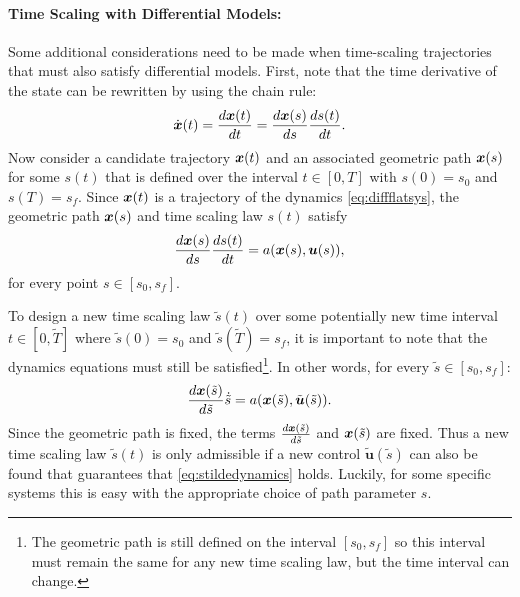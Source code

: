 \paragraph{Time Scaling with Differential Models:}
Some additional considerations need to be made when time-scaling trajectories that must also satisfy differential models.
First, note that the time derivative of the state can be rewritten by using the chain rule:
\begin{equation*}
\dot{\bm{x}}(t) = \frac{d\bm{x}(t)}{dt} = \frac{d\bm{x}(s)}{ds} \frac{ds(t)}{dt}.
\end{equation*}
Now consider a candidate trajectory $\bm{x}(t)$ and an associated geometric path $\bm{x}(s)$ for some $s(t)$ that is defined over the interval $t\in[0,T]$ with $s(0) = s_0$ and $s(T) = s_f$. Since $\bm{x}(t)$ is a trajectory of the dynamics \eqref{eq:diffflatsys}, the geometric path $\bm{x}(s)$ and time scaling law $s(t)$ satisfy
\begin{equation}
\frac{d\bm{x}(s)}{ds} \frac{ds(t)}{dt} = a(\bm{x}(s), \bm{u}(s)),
\end{equation}
for every point $s \in [s_0, s_f]$.

To design a new time scaling law $\tilde{s}(t)$ over some potentially new time interval $t \in [0,\tilde{T}]$ where $\tilde{s}(0) = s_0$ and $\tilde{s}(\tilde{T}) = s_f$, it is important to note that the dynamics equations must still be satisfied\footnote{The geometric path is still defined on the interval $[s_0, s_f]$ so this interval must remain the same for any new time scaling law, but the time interval can change.}. In other words, for every $\tilde{s} \in [s_0, s_f]$:
\begin{equation} \label{eq:stildedynamics}
\frac{d\bm{x}(\tilde{s})}{d\tilde{s}} \dot{\tilde{s}} = a(\bm{x}(\tilde{s}), \tilde{\bm{u}}(\tilde{s})).
\end{equation}
Since the geometric path is fixed, the terms $\frac{d\bm{x}(\tilde{s})}{d\tilde{s}}$ and $\bm{x}(\tilde{s})$ are fixed. Thus a new time scaling law $\tilde{s}(t)$ is only admissible if a new control $\tilde{\bm{u}}(\tilde{s})$ can also be found that guarantees that \eqref{eq:stildedynamics} holds.
Luckily, for some specific systems this is easy with the appropriate choice of path parameter $s$.

